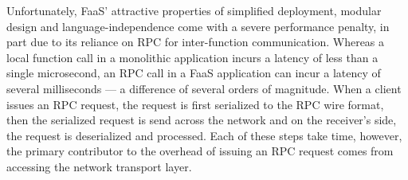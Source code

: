 

Unfortunately, FaaS' attractive properties of simplified deployment, modular design and language-independence come with a severe performance penalty, in part due to its reliance on RPC for inter-function communication. Whereas a local function call in a monolithic application incurs a latency of less than a single microsecond, an RPC call in a FaaS application can incur a latency of several milliseconds --- a difference of several orders of magnitude.  When a client issues an RPC request, the request is first serialized to the RPC wire  format, then the serialized request is send across the network and on the receiver's side, the request is deserialized and processed. Each of these steps take time, however, the primary contributor to the overhead of issuing an RPC request comes from accessing the network transport layer.

